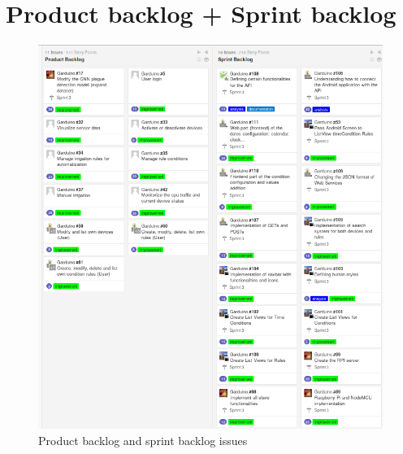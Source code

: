 \documentclass[11pt,a4paper]{article}
\begin{document}
\section{Product backlog + Sprint backlog}
\begin{figure}[hbtp]
\centering
\includegraphics[scale=0.6]{Sprint3.png}
\caption{Product backlog and sprint backlog issues}
\end{figure}
\newpage
\end{document}
